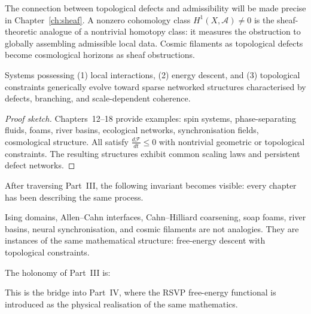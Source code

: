 \begin{AdmPreview}
  The connection between topological defects and admissibility
  will be made precise in Chapter~\ref{ch:sheaf}.
  A nonzero cohomology class $H^1(X, \mathcal{A}) \neq 0$
  is the sheaf-theoretic analogue of a nontrivial homotopy
  class: it measures the obstruction to globally assembling
  admissible local data.
  Cosmic filaments as topological defects become cosmological
  horizons as sheaf obstructions.
\end{AdmPreview}

\begin{theorem}
  \label{thm:universality-coarsening}
  Systems possessing (1) local interactions,
  (2) energy descent, and (3) topological constraints
  generically evolve toward sparse networked structures
  characterised by defects, branching, and scale-dependent
  coherence.
\end{theorem}

\begin{proof}[Proof sketch]
  Chapters~12--18 provide examples: spin systems,
  phase-separating fluids, foams, river basins, ecological
  networks, synchronisation fields, cosmological structure.
  All satisfy $\frac{d\mathcal{F}}{dt} \leq 0$ with nontrivial
  geometric or topological constraints.
  The resulting structures exhibit common scaling laws and
  persistent defect networks.
\end{proof}

\begin{HolonomyNote}
  After traversing Part~III, the following invariant becomes
  visible: every chapter has been describing the same process.

  Ising domains, Allen--Cahn interfaces, Cahn--Hilliard
  coarsening, soap foams, river basins, neural synchronisation,
  and cosmic filaments are not analogies.
  They are instances of the same mathematical structure:
  free-energy descent with topological constraints.

  The holonomy of Part~III is:


  This is the bridge into Part~IV, where the RSVP free-energy
  functional is introduced as the physical realisation of the
  same mathematics.
\end{HolonomyNote}

